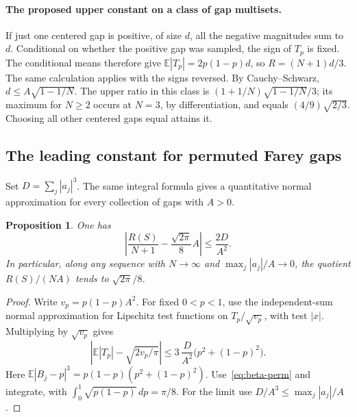 \documentclass[11pt,a4paper]{article}
\newtheorem{proposition}[theorem]{Proposition}
\begin{document}
\paragraph{The proposed upper constant on a class of gap multisets.}
If just one centered gap is positive, of size $d$, all the negative
magnitudes sum to $d$. Conditional on whether the positive gap was
sampled, the sign of $T_p$ is fixed. The conditional means therefore
give $\mathbb E|T_p|=2p(1-p)d$, so $R=(N+1)d/3$. The same calculation
applies with the signs reversed. By Cauchy--Schwarz,
$d\le A\sqrt{1-1/N}$. The upper ratio in this class is
$(1+1/N)\sqrt{1-1/N}/3$; its maximum for $N\ge2$ occurs at $N=3$,
by differentiation, and equals $(4/9)\sqrt{2/3}$. Choosing all other
centered gaps equal attains it.

\subsection{The leading constant for permuted Farey gaps}
Set $D=\sum_j|a_j|^3$. The same integral formula gives a quantitative
normal approximation for every collection of gaps with $A>0$.
\begin{proposition}
\label{prop:fareynormal}
One has
\[
 \left|\frac{R(S)}{N+1}-\frac{\sqrt{2\pi}}8 A\right|
 \le \frac{2D}{A^2}.
\]
In particular, along any sequence with $N\to\infty$ and
$\max_j|a_j|/A\to0$, the quotient $R(S)/(NA)$ tends to
$\sqrt{2\pi}/8$.
\end{proposition}
\begin{proof}
Write $v_p=p(1-p)A^2$. For fixed $0<p<1$, use the independent-sum
normal approximation for Lipschitz test functions
\cite[Theorem~3.1]{cgs} on $T_p/\sqrt{v_p}$, with test $|x|$.
Multiplying by $\sqrt{v_p}$ gives
\[
 \left|\mathbb E|T_p|-\sqrt{2v_p/\pi}\right|
 \le 3\,\frac{D}{A^2}\bigl(p^2+(1-p)^2\bigr).
\]
Here $\mathbb E|B_j-p|^3=p(1-p)(p^2+(1-p)^2)$.
Use~\eqref{eq:beta-perm} and integrate, with
$\int_0^1\sqrt{p(1-p)}\,dp=\pi/8$.
For the limit use $D/A^3\le\max_j|a_j|/A$.
\end{proof}
\end{document}
